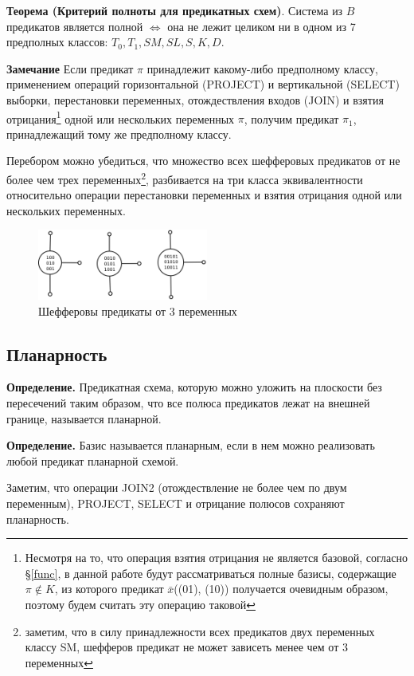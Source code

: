 \documentclass[12pt]{article}
\begin{document}
\textbf{Теорема (Критерий полноты для предикатных схем)}. Система из $B$ предикатов является полной $\iff$
она не лежит целиком ни в одном из 7 предполных классов: $T_0, T_1, SM, SL, S, K, D$. \cite{Shu11} 

\textbf{Замечание} Если предикат $\pi$ принадлежит какому-либо предполному классу, применением 
операций горизонтальной (PROJECT)
и вертикальной (SELECT) выборки, перестановки переменных, отождествления входов (JOIN) и
взятия отрицания\footnote{Несмотря на то, что операция взятия отрицания не является базовой, согласно \S \ref{func},
в данной работе будут рассматриваться полные базисы, содержащие $\pi \notin K$, из которого предикат
$\bar{x}$((01), (10)) получается очевидным образом, поэтому будем считать эту операцию таковой}
одной или нескольких переменных $\pi$, получим
предикат $\pi_1$, принадлежащий тому же предполному классу.


Перебором можно убедиться, что множество всех шефферовых предикатов от не более чем трех переменных\footnote{
заметим, что в силу принадлежности всех предикатов двух переменных классу SM, шефферов предикат не может зависеть
менее чем от 3 переменных}, 
разбивается на три класса эквивалентности относительно операции
перестановки переменных и взятия отрицания одной или нескольких переменных. 

\begin{figure}[htb]
\centering
\includegraphics[width=0.5\textwidth]{scheff3.png}
\caption{Шефферовы предикаты от 3 переменных}
\label{fig:sheff}
\end{figure}


\subsection{Планарность}
\textbf{Определение.} 
Предикатная схема, которую можно уложить на плоскости без пересечений таким образом, что
все полюса предикатов лежат на внешней границе, называется планарной. 

\textbf{Определение.} Базис называется планарным, если в нем можно реализовать любой предикат планарной схемой.

Заметим, что операции JOIN2 (отождествление не более чем по двум переменным), PROJECT, SELECT и отрицание полюсов
сохраняют планарность. 
\end{document}
